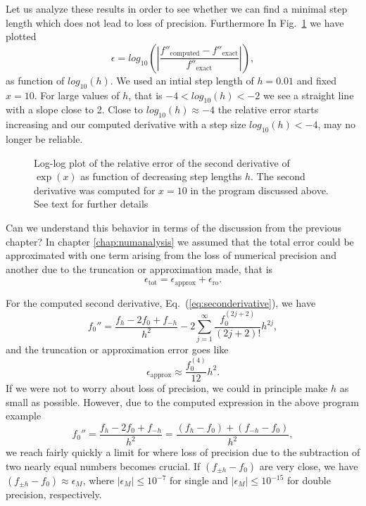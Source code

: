 Let us analyze these results in order to see whether we can find
a minimal step length which does not lead to loss of precision.
Furthermore 
In Fig.~\ref{fig:lossofprecision} we have plotted
\[
   \epsilon=log_{10}\left(\left|\frac{f''_{\mathrm{computed}}-f''_{\mathrm{exact}}}
                 {f''_{\mathrm{exact}}}\right|\right),
\]
as function of $log_{10}(h)$. 
We used an intial step length of $h=0.01$ and fixed $x=10$.
For large values of $h$, that is $-4 < log_{10}(h) < -2$  we see 
a straight line with a slope close to 2. Close to
$log_{10}(h) \approx -4$
the relative error starts increasing and our computed derivative with 
a step size $log_{10}(h)<  -4$, may no longer be reliable.
\begin{figure}
\begin{center}

\end{center}
\caption{Log-log plot of the relative error of the second derivative of $\exp{(x)}$ 
as function of decreasing step lengths $h$. The second derivative
was computed for $x=10$ in the program discussed above. See text for
further details\label{fig:lossofprecision}}
\end{figure}

Can we understand this behavior in terms of the discussion from the previous
chapter?
In chapter \ref{chap:numanalysis} we assumed that the total error
could be approximated with one term arising from the loss of numerical
precision and another due to the truncation or approximation made,
that is
\[
   \epsilon_{\mathrm{tot}}=\epsilon_{\mathrm{approx}}+\epsilon_{\mathrm{ro}}.
\]

For the computed second derivative, Eq.\ (\ref{eq:seconderivative}), we have 
\[
 f_0''=\frac{ f_h -2f_0 +f_{-h}}{h^2}-2\sum_{j=1}^{\infty}\frac{f_0^{(2j+2)}}{(2j+2)!}h^{2j},
\]
and the truncation or approximation error goes like
\[
  \epsilon_{\mathrm{approx}}\approx \frac{f_0^{(4)}}{12}h^{2}.
\]
If we were not to worry about loss of precision, we could in principle
make $h$ as small as possible. 
However, due to the computed expression in the above program example
\[
 f_0''=\frac{ f_h -2f_0 +f_{-h}}{h^2}=\frac{ (f_h -f_0) +(f_{-h}-f_0)}{h^2},
\]
we reach fairly quickly a limit for where loss of precision due to the subtraction
of two nearly equal numbers becomes crucial. 
If $(f_{\pm h} -f_0)$ are very close, we have
$(f_{\pm h} -f_0)\approx \epsilon_M$, where $|\epsilon_M|\le 10^{-7}$ for single and
$|\epsilon_M|\le 10^{-15}$ for double precision, respectively.

